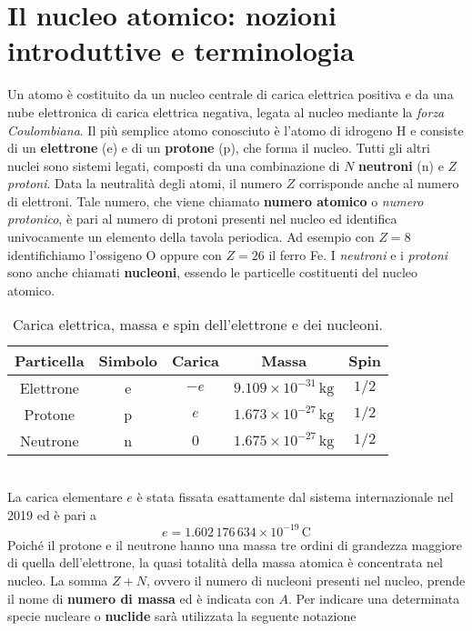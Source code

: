 \section{Il nucleo atomico: nozioni introduttive e terminologia}
Un atomo è costituito da un nucleo centrale di carica elettrica positiva e da una nube elettronica di carica elettrica negativa, legata al nucleo mediante la \textit{forza Coulombiana}. Il più semplice atomo conosciuto è l'atomo di idrogeno H e consiste di un \textbf{elettrone} (e) e di un \textbf{protone} (p), che forma il nucleo. Tutti gli altri nuclei sono sistemi legati, composti da una combinazione di $N$ \textbf{neutroni} (n) e $Z$ \textit{protoni}. Data la neutralità degli atomi, il numero $Z$ corrisponde anche al numero di elettroni. Tale numero, che viene chiamato \textbf{numero atomico} o \textit{numero protonico}, è pari al numero di protoni presenti nel nucleo ed identifica univocamente un elemento della tavola periodica. Ad esempio con $Z = 8$ identifichiamo l'ossigeno O oppure con $Z = 26$ il ferro Fe. I \textit{neutroni} e i \textit{protoni} sono anche chiamati \textbf{nucleoni}, essendo le particelle costituenti del nucleo atomico.
    \begin{table}[ht]
        \centering
        \begin{tabular}{ccccc}
            \toprule
            Particella & Simbolo & Carica & Massa & Spin \\
            \midrule
            Elettrone & e & $-e$ & $9.109 \times 10^{-31} \, \mathrm{kg}$ & $1/2$ \\
            Protone & p & $e$ & $1.673 \times 10^{-27} \, \mathrm{kg}$ &  $1/2$ \\
            Neutrone & n & $0$ & $1.675 \times 10^{-27} \, \mathrm{kg}$ &  $1/2$ \\
            \bottomrule
        \end{tabular}
        \caption{Carica elettrica, massa e spin dell'elettrone e dei nucleoni.}
        \label{tab: atom's particles}
    \end{table}
\\La carica elementare $e$ è stata fissata esattamente dal sistema internazionale nel 2019 ed è pari a 
    \begin{equation*}
        e = 1.602 \, 176 \, 634 \times 10^{-19} \, \mathrm{C}
    \end{equation*}
Poiché il protone e il neutrone hanno una massa tre ordini di grandezza maggiore di quella dell'elettrone, la quasi totalità della massa atomica è concentrata nel nucleo. La somma $Z + N$, ovvero il numero di nucleoni presenti nel nucleo, prende il nome di \textbf{numero di massa} ed è indicata con $A$. Per indicare una determinata specie nucleare o \textbf{nuclide} sarà utilizzata la seguente notazione

